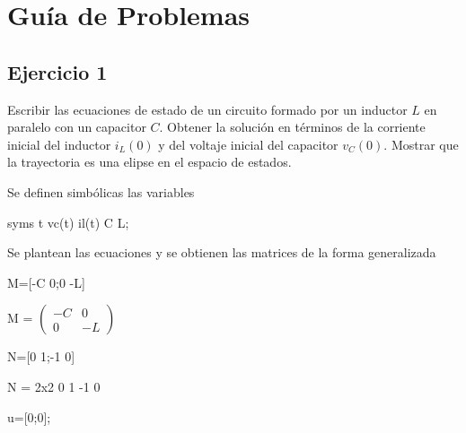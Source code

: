 \documentclass[10pt,a4paper]{article} %
\begin{document}
 \newpage
	\section{Guía de Problemas}
	\subsection{Ejercicio 1} Escribir las ecuaciones de estado de un circuito formado por un inductor $L$ en paralelo con un capacitor $C$. Obtener la solución en términos de la corriente inicial del inductor $i_L(0)$ y del voltaje inicial del capacitor $v_C(0)$. Mostrar que la trayectoria es una elipse en el espacio de estados.\\
	
	\begin{par}
		\begin{flushleft}
			Se definen simbólicas las variables
		\end{flushleft}
	\end{par}
	
	\begin{matlabcode}
		syms t vc(t) il(t) C L;
	\end{matlabcode}
	
	\begin{par}
		\begin{flushleft}
			Se plantean las ecuaciones y se obtienen las matrices de la forma generalizada
		\end{flushleft}
	\end{par}
	
	\begin{matlabcode}
		M=[-C 0;0 -L]
	\end{matlabcode}

	\begin{matlabsymbolicoutput}
		M = 
		$\displaystyle \left(\begin{array}{cc}
		-C & 0\\
		0 & -L
		\end{array}\right)$
	\end{matlabsymbolicoutput}
	
	\begin{matlabcode}
		N=[0 1;-1 0]
	\end{matlabcode}
	\begin{matlaboutput}
		N = 2x2    
		0     1
		-1     0
		
	\end{matlaboutput}
	\begin{matlabcode}
		u=[0;0]; 
	\end{matlabcode}
	
\end{document}
